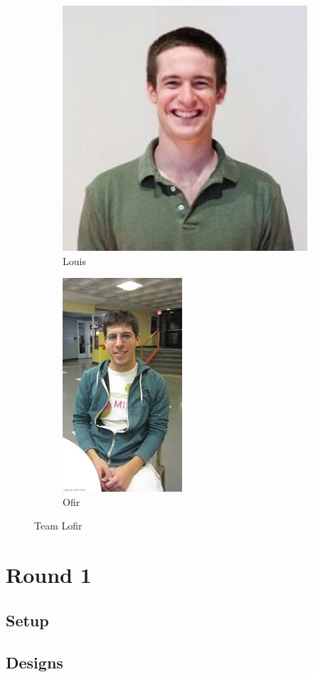 \documentclass[11pt, oneside]{article} %
\numberwithin{equation}{section} %
\numberwithin{figure}{section} %
\numberwithin{table}{section} %
\begin{document}
		\begin{figure}
		\centering
		\begin{subfigure}{.4\textwidth}
			\centering
			\includegraphics[width=.4\textwidth]{resources/louis.jpg}
			\caption{Louis}
		\end{subfigure}
		\begin{subfigure}{.4\textwidth}
			\centering
			\includegraphics[width=.4\textwidth]{resources/ofir.jpg}
			\caption{Ofir}
		\end{subfigure}
		\caption{Team Lofir}
	\end{figure}

\section{Round 1}
	\subsection{Setup}
	\subsection{Designs}
\end{document}
